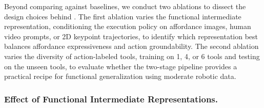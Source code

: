 Beyond comparing against baselines, we conduct two ablations to dissect the design choices behind \algoname{}. The first ablation varies the functional intermediate representation, conditioning the execution policy on affordance images, human video prompts, or 2D keypoint trajectories, to identify which representation best balances affordance expressiveness and action groundability. The second ablation varies the diversity of action-labeled tools, training \algoname{} on 1, 4, or 6 tools and testing on the unseen tools, to evaluate whether the two-stage pipeline provides a practical recipe for functional generalization using moderate robotic data.










\subsubsection{Effect of Functional Intermediate Representations.}

